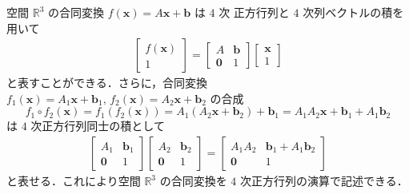 \documentclass[11pt, uplatex, dvipdfmx, titlepage]{jsarticle}
\theoremstyle{definition}
\begin{document}
空間 $\mathbb{R}^3$ の合同変換 $f(\bm{x}) = A\bm{x} + \bm{b}$ は $4$ 次
正方行列と $4$ 次列ベクトルの積を用いて
\begin{align*}
  \left[
  \begin{array}{c}
    f(\bm{x})\\
    1
  \end{array}
  \right] = \left[
  \begin{array}{cc}
    A & \bm{b}\\
    \bm{0} & 1
  \end{array}
             \right] \left[
             \begin{array}{c}
               \bm{x}\\
               1
             \end{array}
  \right]
\end{align*}
と表すことができる．さらに，合同変換
$f_1(\bm{x})=A_1 \bm{x} + \bm{b}_1, \, f_2(\bm{x}) = A_2\bm{x} +
\bm{b}_2$ の合成
\[
  f_1\circ f_2(\bm{x}) =  f_1\left( f_2\left( \bm{x}\right) \right) 
  = A_1\left( A_2 \bm{x}+\bm{b}_2\right)+\bm{b}_1 = A_1 A_2 \bm{x} + \bm{b}_1+A_1\bm{b}_2
\]
は $4$ 次正方行列同士の積として
\begin{align*}
  \left[
  \begin{array}{cc}
    A_1 & \bm{b}_1\\
    \bm{0} & 1
  \end{array}
             \right] \left[
             \begin{array}{cc}
               A_2 & \bm{b}_2\\
               \bm{0} & 1
             \end{array}
                        \right] = \left[
                        \begin{array}{cc}
                          A_1 A_2 & \bm{b}_1+A_1\bm{b}_2\\
                          \bm{0} & 1
                        \end{array}
                                   \right]
\end{align*}
と表せる．これにより空間 $\mathbb{R}^3$ の合同変換を $4$ 次正方行列の演算で記述できる．
\end{document}
